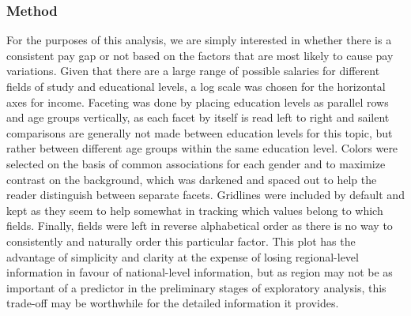\documentclass[]{article}
\begin{document}
\hypertarget{method-4}{%
\subsubsection{Method}\label{method-4}}

For the purposes of this analysis, we are simply interested in whether
there is a consistent pay gap or not based on the factors that are most
likely to cause pay variations. Given that there are a large range of
possible salaries for different fields of study and educational levels,
a log scale was chosen for the horizontal axes for income. Faceting was
done by placing education levels as parallel rows and age groups
vertically, as each facet by itself is read left to right and sailent
comparisons are generally not made between education levels for this
topic, but rather between different age groups within the same education
level. Colors were selected on the basis of common associations for each
gender and to maximize contrast on the background, which was darkened
and spaced out to help the reader distinguish between separate facets.
Gridlines were included by default and kept as they seem to help
somewhat in tracking which values belong to which fields. Finally,
fields were left in reverse alphabetical order as there is no way to
consistently and naturally order this particular factor. This plot has
the advantage of simplicity and clarity at the expense of losing
regional-level information in favour of national-level information, but
as region may not be as important of a predictor in the preliminary
stages of exploratory analysis, this trade-off may be worthwhile for the
detailed information it provides.



\end{document}
